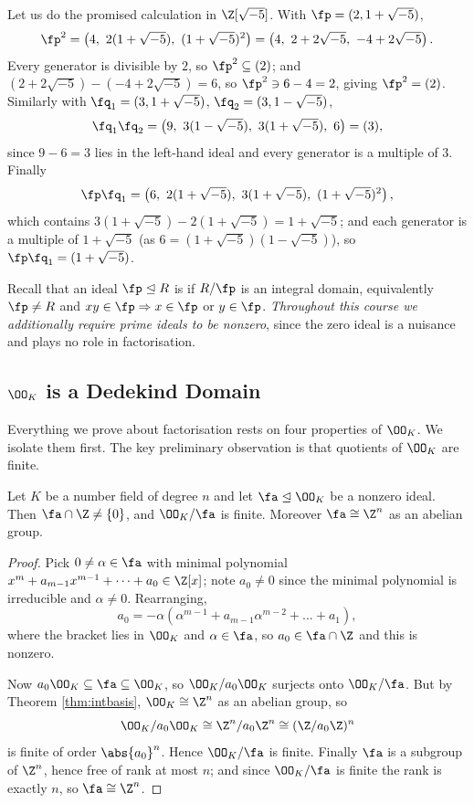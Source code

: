 \begin{example}\label{ex:pcalc}
	Let us do the promised calculation in $\Z[\sqrt{-5}]$. With $\fp = (2, 1+\sqrt{-5})$,
	$$\fp^2 = \left(4,\ 2(1+\sqrt{-5}),\ (1+\sqrt{-5})^2\right) = \left(4,\ 2+2\sqrt{-5},\ -4+2\sqrt{-5}\right).$$
	Every generator is divisible by $2$, so $\fp^2 \subseteq (2)$; and $(2+2\sqrt{-5}) - (-4+2\sqrt{-5}) = 6$, so $\fp^2 \ni 6 - 4 = 2$, giving $\fp^2 = (2)$. Similarly with $\fq_1 = (3,1+\sqrt{-5})$, $\fq_2 = (3,1-\sqrt{-5})$,
	$$\fq_1\fq_2 = \left(9,\ 3(1-\sqrt{-5}),\ 3(1+\sqrt{-5}),\ 6\right) = (3),$$
	since $9 - 6 = 3$ lies in the left-hand ideal and every generator is a multiple of $3$. Finally
	$$\fp\fq_1 = \left(6,\ 2(1+\sqrt{-5}),\ 3(1+\sqrt{-5}),\ (1+\sqrt{-5})^2\right),$$
	which contains $3(1+\sqrt{-5}) - 2(1+\sqrt{-5}) = 1+\sqrt{-5}$;
	and each generator is a multiple of $1+\sqrt{-5}$ (as $6 = (1+\sqrt{-5})(1-\sqrt{-5})$), so $\fp\fq_1 = (1+\sqrt{-5})$.
\end{example}

Recall that an ideal $\fp \trianglelefteq R$ is  if $R/\fp$ is an integral domain, equivalently $\fp \neq R$ and $xy \in \fp \Rightarrow x \in \fp$ or $y \in \fp$. \emph{Throughout this course we additionally require prime ideals to be nonzero}, since the zero ideal is a nuisance and plays no role in factorisation.

\subsection{$\OO_K$ is a Dedekind Domain}

Everything we prove about factorisation rests on four properties of $\OO_K$. We isolate them first. The key preliminary observation is that quotients of $\OO_K$ are finite.

\begin{lemma}\label{lem:finitequot}
	Let $K$ be a number field of degree $n$ and let $\fa \trianglelefteq \OO_K$ be a nonzero ideal. Then $\fa \cap \Z \neq \{0\}$, and $\OO_K/\fa$ is finite. Moreover $\fa \cong \Z^n$ as an abelian group.
\end{lemma}

\begin{proof}
	Pick $0 \neq \alpha \in \fa$ with minimal polynomial $x^m + a_{m-1}x^{m-1}+\dots+a_0 \in \Z[x]$; note $a_0 \neq 0$ since the minimal polynomial is irreducible and $\alpha \neq 0$. Rearranging,
	$$a_0 = -\alpha\left(\alpha^{m-1} + a_{m-1}\alpha^{m-2} + \dots + a_1\right),$$
	where the bracket lies in $\OO_K$ and $\alpha \in \fa$, so $a_0 \in \fa \cap \Z$ and this is nonzero.

	Now $a_0\OO_K \subseteq \fa \subseteq \OO_K$, so $\OO_K/a_0\OO_K$ surjects onto $\OO_K/\fa$. But by Theorem \ref{thm:intbasis}, $\OO_K \cong \Z^n$ as an abelian group, so
	$$\OO_K/a_0\OO_K \cong \Z^n/a_0\Z^n \cong (\Z/a_0\Z)^n$$
	is finite of order $\abs{a_0}^n$. Hence $\OO_K/\fa$ is finite. Finally $\fa$ is a subgroup of $\Z^n$, hence free of rank at most $n$; and since $\OO_K/\fa$ is finite the rank is exactly $n$, so $\fa \cong \Z^n$.
\end{proof}


